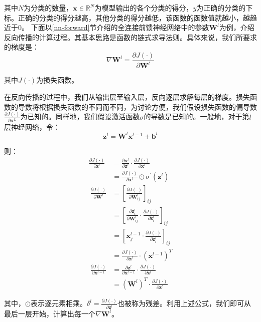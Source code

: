 其中$N$为分类的数量，$\bm{x}\in\mathbb{R}^N$为模型输出的各个分类的得分，$y$为正确的分类的下标。正确的分类的得分越高，其他分类的得分越低，该函数的函数值就越小，越趋近于0。
下面以\ref{nn-forward}节介绍的全连接前馈神经网络中的参数$\bm{W}^l$为例，介绍反向传播的计算过程。其基本思路是函数的链式求导法则。具体来说，我们所要求的梯度是：
\begin{equation}
    \nabla\bm{W}^l=\frac{\partial J\left(\cdot\right)}{\partial\bm{W}^l}
\end{equation}

其中$J\left(\cdot\right)$为损失函数。

在反向传播的过程中，我们从输出层至输入层，反向逐层求解每层的梯度。损失函数的导数将根据损失函数的不同而不同，为讨论方便，我们假设损失函数的偏导数$\frac{\partial J\left(\cdot\right)}{\partial\bm{x}^L}$为已知的。同样地，我们假设激活函数$\sigma$的导数是已知的。一般地，对于第$l$层神经网络，令：
\begin{equation}
    \bm{z}^l=\bm{W}^l\bm{x}^{l-1}+\bm{b}^l
\end{equation}

则：
\begin{align}
    \frac{\partial J\left(\cdot\right)}{\partial\bm{z}^l}&=\frac{\partial\bm{x}^l}{\partial\bm{z}^l}\cdot\frac{\partial J\left(\cdot\right)}{\partial\bm{x}^l}\\
    &=\frac{\partial J\left(\cdot\right)}{\partial\bm{x}^l}\odot\sigma^\prime\left(\bm{z}^l\right)\\
\
    \frac{\partial J\left(\cdot\right)}{\partial\bm{W}^l}&=\left[\frac{\partial J\left(\cdot\right)}{\partial\bm{W}_{ij}^l}\right]_{ij}\\
    &=\left[\frac{\partial\bm{z}_i^l}{\partial\bm{W}_{ij}^l}\cdot\frac{\partial J\left(\cdot\right)}{\partial\bm{z}_i^l}\right]_{ij}\\
    &=\left[\bm{x}_j^{l-1}\cdot\frac{\partial J\left(\cdot\right)}{\partial\bm{z}_i^l}\right]_{ij}\\
    &=\frac{\partial J\left(\cdot\right)}{\partial\bm{z}^l}\cdot\left(\bm{x}^{l-1}\right)^T\\
\
    \frac{\partial J\left(\cdot\right)}{\partial\bm{x}^{l-1}}&=\frac{\partial\bm{z}^l}{\partial\bm{x}^{l-1}}\cdot\frac{\partial J\left(\cdot\right)}{\partial\bm{z}^l}\\
    &=\left(\bm{W}^l\right)^T\cdot\frac{\partial J\left(\cdot\right)}{\partial\bm{z}^l}
\end{align}

其中，$\odot$表示逐元素相乘。$\delta^l=\frac{\partial J\left(\cdot\right)}{\partial\bm{z}^l}$也被称为残差。利用上述公式，我们即可从最后一层开始，计算出每一个$\nabla\bm{W}^l$。

